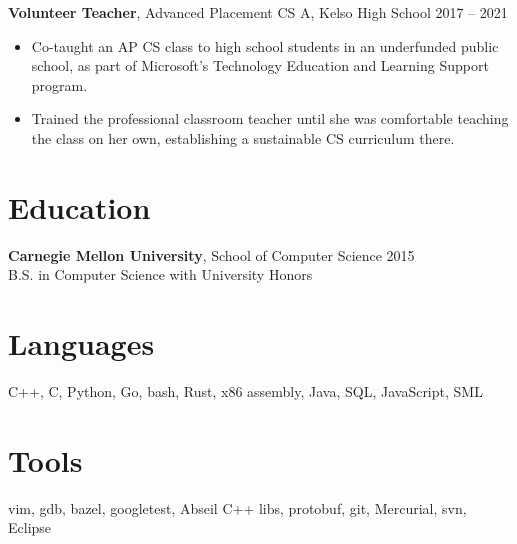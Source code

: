 \documentclass[overlapped]{res}
\newcommand{\experience}[5]{
    \textbf{#3}, #4 \hfill #1 -- #2 \\
    #5
}
\newcommand{\education}[4]{
    \textbf{#2}, #3 \hfill #1 \\
    #4
}
\begin{document}
\begin{resume}
  \experience{2017}{2021}{Volunteer Teacher}{Advanced Placement CS A, Kelso High School}{
    \begin{itemize} \itemsep -1pt
      \item Co-taught an AP CS class to high school students in an
        underfunded public school, as part of Microsoft's Technology Education
        and Learning Support program.
      \item Trained the professional classroom teacher until she was
        comfortable teaching the class on her own, establishing a sustainable
        CS curriculum there.
    \end{itemize}
  }

\section{Education}
  \vspace{0.5ex}

  \education{2015}{Carnegie Mellon University}{School of Computer Science}
  {B.S. in Computer Science with University Honors}

\section{Languages}
  C++, C, Python, Go, bash, Rust, x86 assembly, Java, SQL, JavaScript, SML

\section{Tools}
  vim, gdb, bazel, googletest, Abseil C++ libs, protobuf, git, Mercurial, svn, Eclipse

\end{resume}
\end{document}
